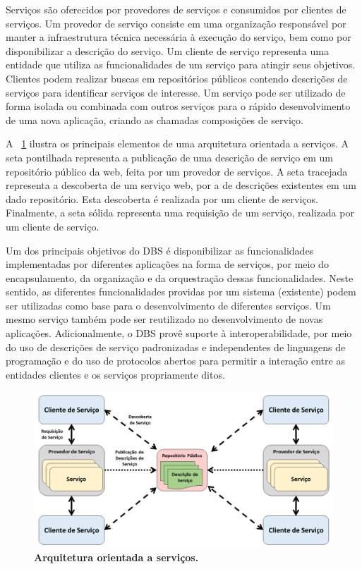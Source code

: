 Serviços são oferecidos por provedores de serviços e consumidos por clientes de serviços. Um provedor de serviço consiste em uma organização responsável por manter a infraestrutura técnica necessária à execução do serviço, bem como por disponibilizar a descrição do serviço. Um cliente de serviço representa uma entidade que utiliza as funcionalidades de um serviço para atingir seus objetivos. Clientes podem realizar buscas em repositórios públicos contendo descrições de serviços para identificar serviços de interesse. Um serviço pode ser utilizado de forma isolada ou combinada com outros serviços para o rápido desenvolvimento de uma nova aplicação, criando as chamadas composições de serviço.

A \figurename~\ref{fig:arquitetura-orientada-servicos} ilustra os principais elementos de uma arquitetura orientada a serviços. A seta pontilhada representa a publicação de uma descrição de serviço em um repositório público da web, feita por um provedor de serviços. A seta tracejada representa a descoberta de um serviço web, por a de descrições existentes em um dado repositório. Esta descoberta é realizada por um cliente de serviços. Finalmente, a seta sólida representa uma requisição de um serviço, realizada por um cliente de serviço.


Um dos principais objetivos do DBS é disponibilizar as funcionalidades implementadas por diferentes aplicações na forma de serviços, por meio do encapsulamento, da organização e da orquestração dessas funcionalidades. Neste sentido, as diferentes funcionalidades providas por um sistema (existente) podem ser utilizadas como base para o desenvolvimento de diferentes serviços. Um mesmo serviço também pode ser reutilizado no desenvolvimento de novas aplicações. Adicionalmente, o DBS provê suporte à interoperabilidade, por meio do uso de descrições de serviço padronizadas e independentes de linguagens de programação e do uso de protocolos abertos para permitir a interação entre as entidades clientes e os serviços propriamente ditos.


\begin{figure}[h]
    \includegraphics[scale=0.45]{2-fundamentacao-teorica/imagens/arquitetura-orientada-a-servicos(1).png}
    \centering
    \caption[Arquitetura orientada à serviços.]{\textbf{Arquitetura orientada a serviços.}}
    \label{fig:arquitetura-orientada-servicos}
\end{figure}